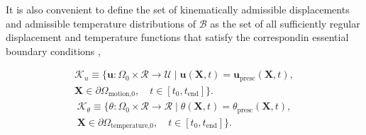 It is also convenient to define the set of kinematically admissible displacements and admissible temperature distributions of $\mathscr{B}$ as the set of all sufficiently regular displacement and temperature functions that satisfy the correspondin essential boundary conditions \citep{de2011computational},
\begin{highlight}[innertopmargin=-5pt]
    \begin{multline}
        \mathscr{K}_u\equiv \{\bm u:\Omega_0\times \mathscr{R}\to \mathscr{U}\;|\;\bm u(\bm X,t) = \bm u_\text{presc} (\bm X,t),\\ \bm X\in\partial \Omega_\text{motion,0},\quad t\in [t_0,t_\text{end}]\}.\quad
    \end{multline}
    \begin{multline}
        \mathscr{K}_\theta\equiv \{\theta:\Omega_0\times \mathscr{R}\to \mathscr{R}\;|\;\theta(\bm X,t) = \theta_\text{presc} (\bm X,t),\\ \bm X\in\partial \Omega_\text{temperature,0},\quad t\in [t_0,t_\text{end}]\}.\quad
    \end{multline}
\end{highlight}

